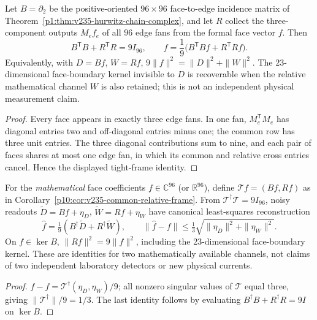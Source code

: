 \documentclass[12pt,a4paper]{article}
\begin{document}
\begin{corollary}
\label{p10:cor:v235-common-relative-frame}
Let \(B=\partial_2\) be the positive-oriented \(96\times96\)
face-to-edge incidence matrix of
Theorem~\ref{p1:thm:v235-hurwitz-chain-complex}, and let \(R\)
collect the three-component outputs \(M_ef_e\) of all \(96\)
edge fans from the formal face vector \(f\).  Then
\[
 B^{\mathsf T}B+R^{\mathsf T}R=9I_{96},\qquad
 f=\frac19\bigl(B^{\mathsf T}Bf+R^{\mathsf T}Rf\bigr).
\]
Equivalently, with \(D=Bf\), \(W=Rf\),
\(9\|f\|^2=\|D\|^2+\|W\|^2\).
The \(23\)-dimensional face-boundary kernel invisible to \(D\) is
recoverable when the relative mathematical channel \(W\) is also
retained; this is not an independent physical measurement claim.
\end{corollary}
\begin{proof}
Every face appears in exactly three edge fans.  In one fan,
\(M_e^{\mathsf T}M_e\) has diagonal entries two and off-diagonal
entries minus one; the common row has three unit entries.
The three diagonal contributions sum to nine, and each pair of
faces shares at most one edge fan, in which its common and relative
cross entries cancel.  Hence the displayed tight-frame identity.
\end{proof}

\begin{corollary}
\label{p10:cor:v3026-common-relative-stability}
For the \emph{mathematical} face coefficients $f\in\mathbb C^{96}$
(or $\mathbb R^{96}$), define $\mathcal T f=(Bf,Rf)$ as in
Corollary~\ref{p10:cor:v235-common-relative-frame}.  From
$\mathcal T^\dagger\mathcal T=9I_{96}$, noisy readouts
$\widetilde D=Bf+\eta_D$, $\widetilde W=Rf+\eta_W$ have
canonical least-squares reconstruction
\[
\boxed{\widehat f=\tfrac19
(B^\dagger\widetilde D+R^\dagger\widetilde W),\qquad
\|\widehat f-f\|\le\tfrac13
\sqrt{\|\eta_D\|^2+\|\eta_W\|^2}.}
\]
On $f\in\ker B$, $\|Rf\|^2=9\|f\|^2$, including the
23-dimensional face-boundary kernel. These are identities for two
mathematically available channels, not claims of two independent
laboratory detectors or new physical currents.
\end{corollary}
\begin{proof}
$\widehat f-f=\mathcal T^\dagger(\eta_D,\eta_W)/9$;
all nonzero singular values of $\mathcal T$ equal three, giving
$\|\mathcal T^\dagger\|/9=1/3$.
The last identity follows by evaluating
$B^\dagger B+R^\dagger R=9I$ on $\ker B$.
\end{proof}
\end{document}
